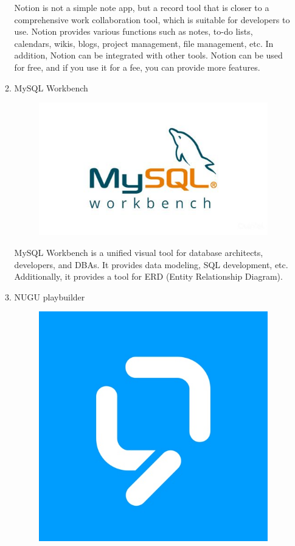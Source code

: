 \documentclass[conference]{IEEEtran}
\begin{document}
\begin{enumerate}
\begin{enumerate}
\begin{figure}[H]
                 \end{figure}
        Notion is not a simple note app, but a record tool that is closer to a comprehensive work collaboration tool, which is suitable for developers to use. Notion provides various functions such as notes, to-do lists, calendars, wikis, blogs, project management, file management, etc. In addition, Notion can be integrated with other tools. Notion can be used for free, and if you use it for a fee, you can provide more features.
        \item MySQL Workbench\\
        \begin{figure}[H]
                 \centering
                 \includegraphics[scale=0.2]{new_assets/mysqlWB-logo.jpg}
                 \end{figure}
        MySQL Workbench is a unified visual tool for database architects, developers, and DBAs. It provides data modeling, SQL development, etc. Additionally, it provides a tool for ERD (Entity Relationship Diagram).
        \item NUGU playbuilder\\
        \begin{figure}[H]
                 \centering
                 \includegraphics[scale=0.2]{new_assets/nugu-logo.jpg}

\end{figure}
\end{enumerate}
\end{enumerate}
\end{document}
